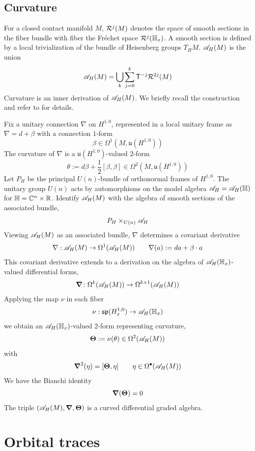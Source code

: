 \documentclass[11pt]{amsart}
\theoremstyle{plain}
\theoremstyle{definition}
\theoremstyle{remark}
\begin{document}
\subsection{Curvature}\label{sec:curvature}

For a closed contact manifold $M$,
$\mathcal{R}^j(M)$ denotes the space of smooth sections in the fiber bundle with fiber
the Fr\'echet space $\mathcal{R}^j(\mathbb{H}_x)$.
A smooth section is defined by a local trivialization of the bundle of Heisenberg groups $T_HM$.
${\mathscr{A}}_H(M)$ is the union
\[ {\mathscr{A}}_H(M) = \bigcup_{k} \sum_{j=0}^k \mathsf{T}^{-j} \mathcal{R}^{2j}(M)\]
Curvature is an inner derivation of ${\mathscr{A}}_H(M)$.
We briefly recall the construction and refer to \cite{GvE20} for details.

Fix a unitary connection $\nabla$ on $H^{1,0}$,
represented in a local unitary frame as $\nabla=d+\beta$ with a connection $1$-form
\[ \beta\in \Omega^1(M,\mathfrak u(H^{1,0}))\]
The curvature of $\nabla$ is a $\mathfrak u(H^{1,0})$-valued $2$-form
\[ \theta:= d\beta+\frac{1}{2}[\beta,\beta]\in \Omega^2(M, \mathfrak u(H^{1,0}))\]
Let $P_H$ be the principal $U(n)$-bundle of orthonormal frames of $H^{1,0}$.
The unitary group $U(n)$ acts by automorphisms on the model algebra ${\mathscr{A}}_H={\mathscr{A}}_H(\mathbb{H})$ for $\mathbb{H}={\mathbb{C}}^n\times{\mathbb{R}}$.
Identify ${\mathscr{A}}_H(M)$ with the algebra of smooth sections of the associated bundle,
\[P_H\times_{U(n)}{\mathscr{A}}_H\]
Viewing ${\mathscr{A}}_H(M)$ as an associated bundle, $\nabla$ determines a covariant derivative
\[ \nabla:{\mathscr{A}}_H(M)\to \Omega^1({\mathscr{A}}_H(M))\qquad \nabla(a):=da+\beta\cdot a\]
This covariant derivative extends to a derivation on the algebra of ${\mathscr{A}}_H(\mathbb{H}_x)$-valued differential forms,
\begin{equation*}%
\con  \colon  \Omega^k(\Alg_H(M)) \to \Omega^{k+1}(\Alg_H(M))
\end{equation*}
Applying the map $\nu$ in each fiber
\[ \nu:\mathfrak{sp}(H^{1,0}_x)\to {\mathscr{A}}_H(\mathbb{H}_x)\]
we obtain an ${\mathscr{A}}_H(\mathbb{H}_x)$-valued 2-form representing curvature,
\[ \boldsymbol{\Theta} := \nu(\theta)\in \Omega^2({\mathscr{A}}_H(M))\]
with
\begin{equation*}
    \boldsymbol{\nabla}^2(\eta) = [\boldsymbol{\Theta},\eta]\qquad  \eta\in \Omega^\bullet({\mathscr{A}}_H(M))
\end{equation*}
We have the Bianchi identity
\[ \boldsymbol{\nabla}(\boldsymbol{\Theta})=0\]
The triple $({\mathscr{A}}_H(M), \boldsymbol{\nabla}, \boldsymbol{\Theta})$ is a curved differential graded algebra.






\section{Orbital traces}
\label{sec:orbital-traces}
\end{document}
